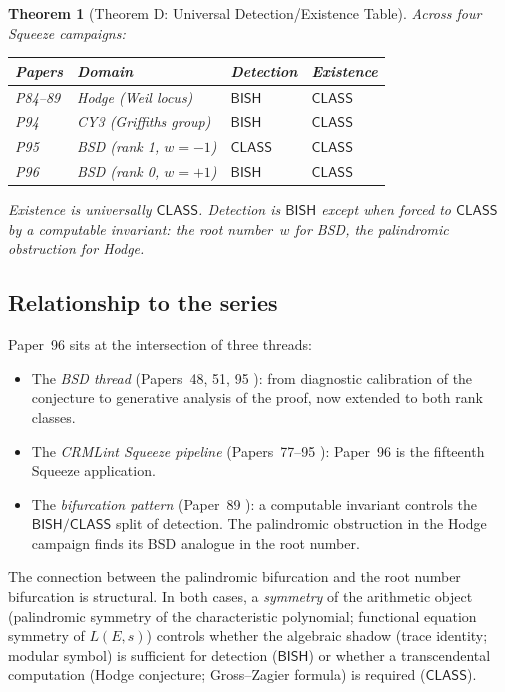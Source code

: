 \documentclass[11pt]{article}
\theoremstyle{plain}
\newtheorem{theorem}{Theorem}[section]
\theoremstyle{definition}
\theoremstyle{remark}
\newcommand{\BISH}{\ensuremath{\mathsf{BISH}}}
\newcommand{\CLASS}{\ensuremath{\mathsf{CLASS}}}
\begin{document}
\begin{theorem}[Theorem D: Universal Detection/Existence Table]
\label{thm:D}
Across four Squeeze campaigns:
\begin{center}
\begin{tabular}{llll}
\toprule
\textbf{Papers} & \textbf{Domain} & \textbf{Detection} & \textbf{Existence} \\
\midrule
P84--89 & Hodge (Weil locus) & $\BISH$ & $\CLASS$ \\
P94 & CY3 (Griffiths group) & $\BISH$ & $\CLASS$ \\
P95 & BSD (rank 1, $w = -1$) & $\CLASS$ & $\CLASS$ \\
P96 & BSD (rank 0, $w = +1$) & $\BISH$ & $\CLASS$ \\
\bottomrule
\end{tabular}
\end{center}
Existence is universally $\CLASS$. Detection is $\BISH$ except when forced to $\CLASS$ by a computable invariant: the root number~$w$ for BSD, the palindromic obstruction for Hodge.
\end{theorem}

\subsection{Relationship to the series}

Paper~96 sits at the intersection of three threads:
\begin{itemize}[nosep]
\item The \emph{BSD thread} (Papers~48, 51, 95 \cite{paper48,paper51,paper95}): from diagnostic calibration of the conjecture to generative analysis of the proof, now extended to both rank classes.
\item The \emph{CRMLint Squeeze pipeline} (Papers~77--95 \cite{paper80,paper90}): Paper~96 is the fifteenth Squeeze application.
\item The \emph{bifurcation pattern} (Paper~89 \cite{paper89}): a computable invariant controls the $\BISH/\CLASS$ split of detection. The palindromic obstruction in the Hodge campaign finds its BSD analogue in the root number.
\end{itemize}

The connection between the palindromic bifurcation and the root number bifurcation is structural. In both cases, a \emph{symmetry} of the arithmetic object (palindromic symmetry of the characteristic polynomial; functional equation symmetry of $L(E,s)$) controls whether the algebraic shadow (trace identity; modular symbol) is sufficient for detection ($\BISH$) or whether a transcendental computation (Hodge conjecture; Gross--Zagier formula) is required ($\CLASS$).
\end{document}

